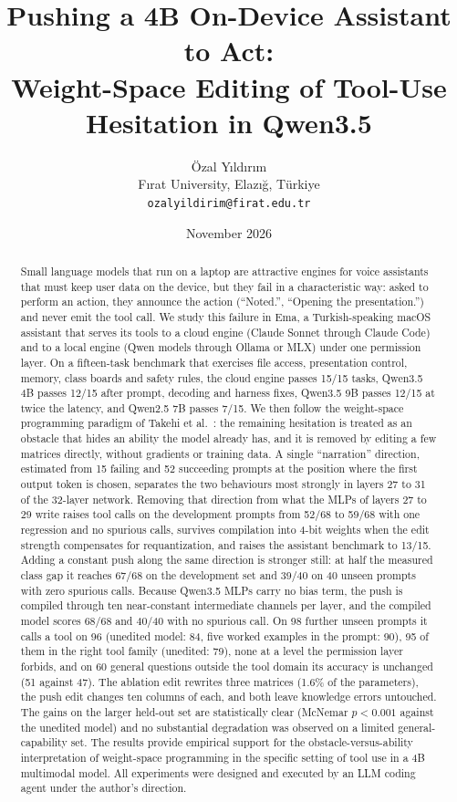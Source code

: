 \documentclass[11pt]{article}
\title{Pushing a 4B On-Device Assistant to Act: \\ Weight-Space Editing of Tool-Use Hesitation in Qwen3.5}
\author{Özal Yıldırım\\ Fırat University, Elazığ, Türkiye\\ \texttt{ozalyildirim@firat.edu.tr}}
\date{November 2026}
\begin{document}
\maketitle

\begin{abstract}
Small language models that run on a laptop are attractive engines for voice assistants that must keep user data on the device, but they fail in a characteristic way: asked to perform an action, they announce the action (``Noted.'', ``Opening the presentation.'') and never emit the tool call. We study this failure in Ema, a Turkish-speaking macOS assistant that serves its tools to a cloud engine (Claude Sonnet through Claude Code) and to a local engine (Qwen models through Ollama or MLX) under one permission layer. On a fifteen-task benchmark that exercises file access, presentation control, memory, class boards and safety rules, the cloud engine passes 15/15 tasks, Qwen3.5 4B passes 12/15 after prompt, decoding and harness fixes, Qwen3.5 9B passes 12/15 at twice the latency, and Qwen2.5 7B passes 7/15. We then follow the weight-space programming paradigm of Takehi et al.~\citep{takehi2026weightspace}: the remaining hesitation is treated as an obstacle that hides an ability the model already has, and it is removed by editing a few matrices directly, without gradients or training data. A single ``narration'' direction, estimated from 15 failing and 52 succeeding prompts at the position where the first output token is chosen, separates the two behaviours most strongly in layers 27 to 31 of the 32-layer network. Removing that direction from what the MLPs of layers 27 to 29 write raises tool calls on the development prompts from 52/68 to 59/68 with one regression and no spurious calls, survives compilation into 4-bit weights when the edit strength compensates for requantization, and raises the assistant benchmark to 13/15. Adding a constant push along the same direction is stronger still: at half the measured class gap it reaches 67/68 on the development set and 39/40 on 40 unseen prompts with zero spurious calls. Because Qwen3.5 MLPs carry no bias term, the push is compiled through ten near-constant intermediate channels per layer, and the compiled model scores 68/68 and 40/40 with no spurious call. On 98 further unseen prompts it calls a tool on 96 (unedited model: 84, five worked examples in the prompt: 90), 95 of them in the right tool family (unedited: 79), none at a level the permission layer forbids, and on 60 general questions outside the tool domain its accuracy is unchanged (51 against 47). The ablation edit rewrites three matrices (1.6\% of the parameters), the push edit changes ten columns of each, and both leave knowledge errors untouched. The gains on the larger held-out set are statistically clear (McNemar $p < 0.001$ against the unedited model) and no substantial degradation was observed on a limited general-capability set. The results provide empirical support for the obstacle-versus-ability interpretation of weight-space programming in the specific setting of tool use in a 4B multimodal model. All experiments were designed and executed by an LLM coding agent under the author's direction.
\end{abstract}
\end{document}
